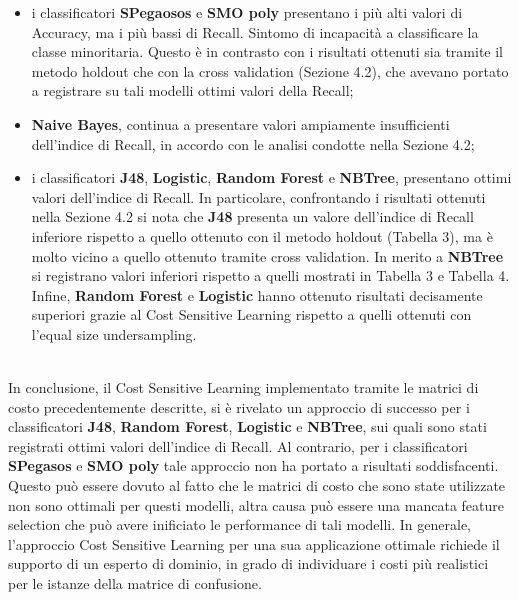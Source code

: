 \documentclass[fleqn,10pt]{SelfArx}
\begin{document}
\begin{itemize}
    \item i classificatori \textbf{SPegaosos} e \textbf{SMO poly} presentano i più alti valori di Accuracy, ma i più bassi di Recall. Sintomo di incapacità a classificare la classe minoritaria. Questo è in contrasto con i risultati ottenuti sia tramite il metodo holdout che con la cross validation (Sezione 4.2), che avevano portato a registrare su tali modelli ottimi valori della Recall;
    \item \textbf{Naive Bayes}, continua a presentare valori ampiamente insufficienti dell'indice di Recall, in accordo con le analisi condotte nella Sezione 4.2;
    \item i classificatori \textbf{J48}, \textbf{Logistic}, \textbf{Random Forest} e \textbf{NBTree}, presentano ottimi valori dell'indice di Recall. In particolare, confrontando i risultati ottenuti nella Sezione 4.2 si nota che \textbf{J48} presenta un valore dell'indice di Recall inferiore rispetto a quello ottenuto con il metodo holdout (Tabella 3), ma è molto vicino a quello ottenuto tramite cross validation. In merito a \textbf{NBTree} si registrano valori inferiori rispetto a quelli mostrati in Tabella 3 e Tabella 4. Infine, \textbf{Random Forest} e \textbf{Logistic} hanno ottenuto risultati decisamente superiori grazie al Cost Sensitive Learning rispetto a quelli ottenuti con l'equal size undersampling. 
\end{itemize}
\\
In conclusione, il Cost Sensitive Learning implementato tramite le matrici di costo precedentemente descritte, si è rivelato un approccio di successo per i classificatori \textbf{J48}, \textbf{Random Forest}, \textbf{Logistic} e \textbf{NBTree}, sui quali sono stati registrati ottimi valori dell'indice di Recall. Al contrario, per i classificatori \textbf{SPegasos} e \textbf{SMO poly} tale approccio non ha portato a risultati soddisfacenti. Questo può essere dovuto al fatto che le matrici di costo che sono state utilizzate non sono ottimali per questi modelli, altra causa può essere una mancata feature selection che può avere inificiato le performance di tali modelli.
In generale, l'approccio Cost Sensitive Learning per una sua applicazione ottimale richiede il supporto di un esperto di dominio, in grado di individuare i costi più realistici per le istanze della matrice di confusione.
\end{document}
